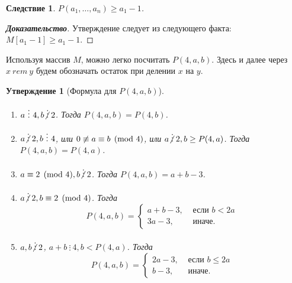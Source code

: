 \documentclass[12pt]{article}
\newtheorem{proposition}[theorem]{Утверждение}
\newtheorem{corollary}[theorem]{Следствие}
\begin{document}
\begin{corollary}
\label{corollary:pGea1}
$P(a_1, \dots, a_n) \ge a_1 - 1$.
\end{corollary}
\begin{proof}[\textbf{Доказательство}]
Утверждение следует из следующего факта: $M[a_1 - 1] \ge a_1 - 1$.
\end{proof}

Используя массив $M$, можно легко посчитать $P(4, a, b)$. Здесь и далее через $x \ rem \ y$ будем обозначать  остаток при делении $x$ на $y$.

\begin{proposition}[Формула для $P(4, a, b)$] { \ }

\begin{enumerate}
	\item $a \ \vdots \ 4, b \centernot \vdots 2$. Тогда $P(4, a, b) = P(4, b)$.

	\item $a \centernot \vdots 2, b \ \vdots \ 4$, или $0 \centernot \equiv a \equiv b \pmod 4$, или $a \centernot\vdots 2, b \ge P(4, a)$. Тогда $P(4, a, b) = P(4, a)$.
	
	\item $a \equiv 2 \pmod 4, b \centernot \vdots 2$. Тогда $P(4, a, b) = a + b - 3$.
		
	\item $a \centernot\vdots 2, b \equiv 2 \pmod 4$. Тогда
	\begin{equation*}
		P(4, a, b) = \begin{cases}
			a + b - 3, &\text{ если } b < 2a \\
			3a - 3,  &\text{ иначе.}
		\end{cases}
	\end{equation*}		

	\item $a, b \centernot \vdots 2$, $a + b \ \vdots \ 4, b < P(4, a)$. Тогда \begin{equation*}
		P(4, a, b) = \begin{cases}
			2a - 3, &\text{ если } b \le 2a \\
			b - 3,  &\text{ иначе.}
		\end{cases}
	\end{equation*}
\end{enumerate}
\end{proposition}
\end{document}

